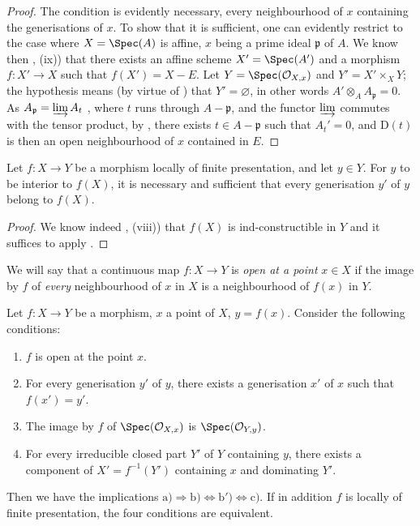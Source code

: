 \begin{proof}
The condition is evidently necessary, every neighbourhood of $x$ containing the generisations of $x$.
To show that it is sufficient, one can evidently restrict to the case where $X=\Spec(A)$ is affine, $x$ being a prime ideal $\mathfrak{p}$ of $A$.
We know then , (ix)) that there exists an affine scheme $X'=\Spec(A')$ and a morphism $f:X'\to X$ such that $f(X')=X-E$.
Let $Y=\Spec(\mathcal{O}_{X,x})$ and $Y'=X'\times_X Y$; the hypothesis means (by virtue of ) that $Y'=\varnothing$, in other words $A'\otimes_A A_\mathfrak{p}=0$.
As $A_\mathfrak{p}=\varinjlim A_t$ , where $t$ runs through $A-\mathfrak{p}$, and the functor $\varinjlim$ commutes with the tensor product, by , there exists $t\in A-\mathfrak{p}$ such that $A_t'=0$, and $\mathrm{D}(t)$ is then an open neighbourhood of $x$ contained in $E$.
\end{proof}

\begin{corollary}[1.10.2]
\label{IV.1.10.2}
Let $f:X\to Y$ be a morphism locally of finite presentation, and let $y\in Y$.
For $y$ to be interior to $f(X)$, it is necessary and sufficient that every generisation $y'$ of $y$ belong to $f(X)$.
\end{corollary}

\begin{proof}
We know indeed , (viii)) that $f(X)$ is ind-constructible in $Y$ and it suffices to apply .
\end{proof}

We will say that a continuous map $f:X\to Y$ is \emph{open at a point} $x\in X$ if the image by $f$ of \emph{every} neighbourhood of $x$ in $X$ is a neighbourhood of $f(x)$ in $Y$.

\begin{proposition}[1.10.3]
\label{IV.1.10.3}
Let $f:X\to Y$ be a morphism, $x$ a point of $X$, $y=f(x)$.
Consider the following conditions:
\begin{enumerate}
  \item[\rm a)] $f$ is open at the point $x$.
  \item[\rm b)] For every generisation $y'$ of $y$, there exists a generisation $x'$ of $x$ such that $f(x')=y'$.
  \item[\rm b$'$)] The image by $f$ of $\Spec(\mathcal{O}_{X,x})$ is $\Spec(\mathcal{O}_{Y,y})$.
  \item[\rm c)] For every irreducible closed part $Y'$ of $Y$ containing $y$, there exists a component of $X'=f^{-1}(Y')$ containing $x$ and dominating $Y'$.
\end{enumerate}
Then we have the implications $\mathrm{a)}\Rightarrow\mathrm{b)}\Leftrightarrow\mathrm{b')}\Leftrightarrow\mathrm{c)}$.
If in addition $f$ is locally of finite presentation, the four conditions are equivalent.
\end{proposition}

